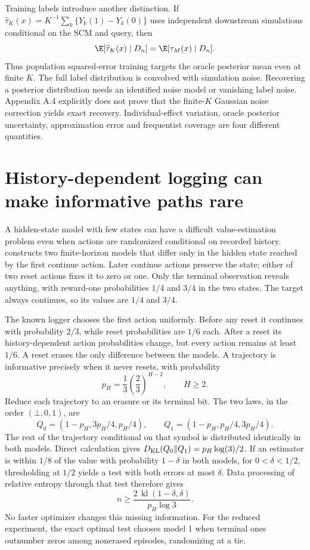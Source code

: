 Training labels introduce another distinction. If
$\widehat\tau_K(x)=K^{-1}\sum_k\{Y_k(1)-Y_k(0)\}$ uses independent
downstream simulations conditional on the SCM and query, then
\[
 \E[\widehat\tau_K(x)\mid D_n]
       =\E[\tau_M(x)\mid D_n].
\]
Thus population squared-error training targets the oracle posterior mean
even at finite $K$. The full label distribution is convolved with simulation
noise. Recovering a posterior distribution needs an identified noise
model or vanishing label noise. Appendix A.4 explicitly does not prove
that the finite-$K$ Gaussian noise correction yields exact recovery.
Individual-effect variation, oracle posterior uncertainty, approximation
error and frequentist coverage are four different quantities.

\section{History-dependent logging can make informative paths rare}
\label{r3:ope-hardness}

A hidden-state model with few states can have a difficult value-estimation
problem even when actions are randomized conditional on recorded history.
\citet[Sections 2--5]{opehard2026} constructs two finite-horizon models
that differ only in the hidden state reached by the first continue
action. Later continue actions preserve the state; either of two reset
actions fixes it to zero or one. Only the terminal observation reveals
anything, with reward-one probabilities $1/4$ and $3/4$ in the two states.
The target always continues, so its values are $1/4$ and $3/4$.

The known logger chooses the first action uniformly. Before any reset it
continues with probability $2/3$, while reset probabilities are $1/6$
each. After a reset its history-dependent action probabilities change,
but every action remains at least $1/6$. A reset erases the only difference
between the models. A trajectory is informative precisely when it never
resets, with probability
\[
p_H=\frac13\left(\frac23\right)^{H-2},\qquad H\ge2.
\]
Reduce each trajectory to an erasure or its terminal bit. The two laws,
in the order $(\bot,0,1)$, are
\[
 Q_0=(1-p_H,3p_H/4,p_H/4),\qquad
 Q_1=(1-p_H,p_H/4,3p_H/4).
\]
The rest of the trajectory conditional on that symbol is distributed
identically in both models. Direct calculation gives
$D_{\rm KL}(Q_0\Vert Q_1)=p_H\log(3)/2$. If an estimator is within $1/8$
of the value with probability $1-\delta$ in both models, for
$0<\delta<1/2$, thresholding at
$1/2$ yields a test with both errors at most $\delta$. Data processing
of relative entropy through that test therefore gives
\begin{equation}
 n\geq\frac{2\,\operatorname{kl}(1-\delta,\delta)}
                  {p_H\log3}.
 \label{r3:rare-path-bound}
\end{equation}
No faster optimizer changes this missing information. For the reduced
experiment, the exact optimal test chooses model 1 when terminal ones
outnumber zeros among nonerased episodes, randomizing at a tie.

